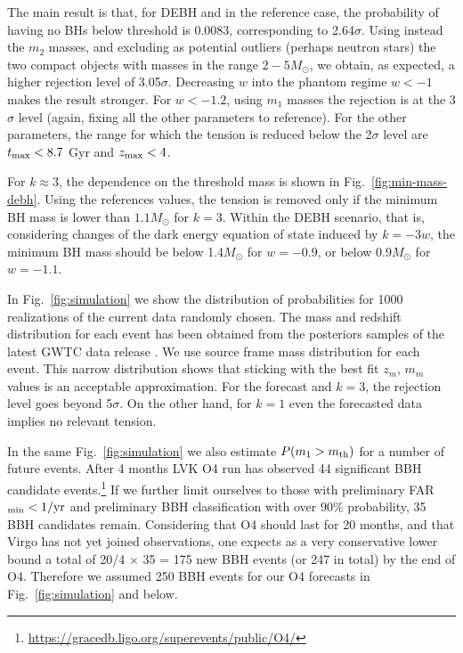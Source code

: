 \documentclass[fleqn,usenatbib,useAMS]{mnras}
\begin{document}
The main result is that, for DEBH and in the reference case, the probability of having no BHs below threshold is 0.0083, corresponding to 2.64$\sigma$. 
Using instead the $m_2$ masses, and excluding as potential outliers (perhaps neutron stars) the two compact objects with masses in the range  $2-5 M_\odot$, we obtain, as expected, a higher rejection level of 3.05$\sigma$. Decreasing $w$ into the phantom regime $w<-1$ makes the result stronger. For $w<-1.2$, using $m_1$ masses the rejection is at the 3$\sigma$ level (again, fixing all the other parameters to reference). For the other parameters, the range for which the tension is reduced below the 2$\sigma$ level are $t_{\rm max} < 8.7$ Gyr and $z_{\rm max} < 4$.

For $k \approx 3$, the dependence on the threshold mass is shown 
in Fig.~\ref{fig:min-mass-debh}. Using the references values, the tension is removed only if the minimum BH mass is lower than $1.1 M_\odot$ for $k =3 $. Within the DEBH scenario, that is, considering changes of the dark energy equation of state induced by $k = - 3 w$, the minimum BH mass should be below 1.4$M_\odot$ for $w = -0.9$, or below 0.9$M_\odot$ for $w = -1.1$. 

In Fig.~\ref{fig:simulation} we show the distribution of probabilities for 1000 realizations of the current data randomly chosen. 
The mass and redshift distribution for each event has been obtained from the posteriors samples of the latest GWTC data release \citep{LIGOScientific:2018mvr, LIGOScientific:2021usb, LIGOScientific:2021djp}. We use source frame mass distribution for each event.
 This narrow distribution shows that sticking with the best fit $z_m,\, m_m$ values is an acceptable approximation. For the forecast and $k=3$, the rejection level goes beyond 5$\sigma$. On the other hand, for $k=1$ even the forecasted data implies no relevant tension. 

In the same Fig.~\ref{fig:simulation} we  also estimate  $P(m_1>m_{\rm th})$ for a number of future events.  
After 4 months LVK O4 run has observed 44  significant BBH candidate events.\footnote{\url{https://gracedb.ligo.org/superevents/public/O4/}} If we further limit ourselves to those with preliminary FAR$_{\rm min} < 1 / {\rm yr}$ and preliminary BBH classification with over 90\% probability, 35 BBH candidates remain. Considering that O4 should last for 20 months, and that Virgo has not yet joined observations, one expects as a very conservative lower bound a total of 20/4 $\times$ 35 = 175 new BBH events (or 247 in total) by the end of O4. Therefore we  assumed 250 BBH events for our O4 forecasts in Fig.~\ref{fig:simulation}  and below. 
\end{document}
